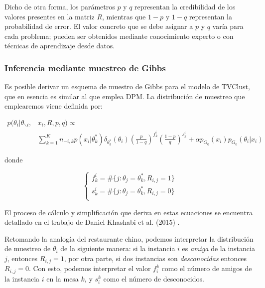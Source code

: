 Dicho de otra forma, los parámetros $p$ y $q$ representan la credibilidad de los valores presentes en la matriz $R$, mientras que $1 - p$ y $1 - q$ representan la probabilidad de error. El valor concreto que se debe asignar a $p$ y $q$ varía para cada problema; pueden ser obtenidos mediante conocimiento experto o con técnicas de aprendizaje desde datos.

\subsubsection{Inferencia mediante muestreo de Gibbs}

Es posible derivar un esquema de muestro de Gibbs para el modelo de \acs{TVClust}, que en esencia es similar al que emplea \acf{DPM}. La distribución de muestreo que emplearemos viene definida por:

\begin{equation}
\begin{split}
p(\theta_i | \theta_{\backslash i}, & x_i, R, p, q) \varpropto \\
 &\sum_{k = 1}^{K} n_{-i,k} p(x_i|\theta_{k}^*) \delta_{\theta_{k}^*}(\theta_{i}) \left(\frac{p}{1-q}\right)^{f_{k}^i} \left(\frac{1-p}{q}\right)^{s_{k}^i} + \alpha p_{G_0}(x_i)p_{G_0}(\theta_i | x_i)
\end{split}
\label{eqn51}
\end{equation}

donde 

\begin{equation}
\begin{cases}
f_{k}^i = \#\{j:\theta_j = \theta_{k}^*, R_{i,j} = 1\}\\
s_{k}^i = \#\{j:\theta_j = \theta_{k}^*, R_{i,j} = 0\}\\
\end{cases}
\label{eqn52}
\end{equation}

El proceso de cálculo y simplificación que deriva en estas ecuaciones se encuentra detallado en el trabajo de Daniel Khashabi et al. (2015) \cite{RDPM:2015}.

Retomando la analogía del restaurante chino, podemos interpretar la distribución de muestreo de $\theta_i$ de la siguiente manera: si la instancia $i$ es \textit{amiga} de la instancia $j$, entonces $R_{i,j} = 1$, por otra parte, si dos instancias son \textit{desconocidas} entonces $R_{i,j} = 0$. Con esto, podemos interpretar el valor $f_{i}^k$ como el número de amigos de la instancia $i$ en la mesa $k$, y $s_{i}^k$ como el número de desconocidos.

